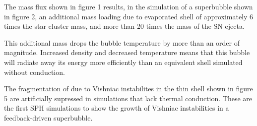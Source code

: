 \documentclass[extrafontsizes, 30pt]{memoir}
\begin{document}
The mass flux shown in figure 1 results, in the simulation of a
superbubble shown in figure 2, an additional mass loading due to evaporated shell of
approximately 6 times the star cluster mass, and more than 20 times the mass of
the SN ejecta.

This additional mass drops the bubble temperature by more than an
order of magnitude.  Increased density and decreased temperature means that
this bubble will radiate away its energy more efficiently than an equivalent
shell simulated without conduction.

The fragmentation of due to Vishniac instabilites in the thin shell
shown in figure 5 are artificially supressed in simulations that lack
thermal conduction. These are the first SPH simulations to show the growth of
Vishniac instabilities in a feedback-driven superbubble.
\end{document}
